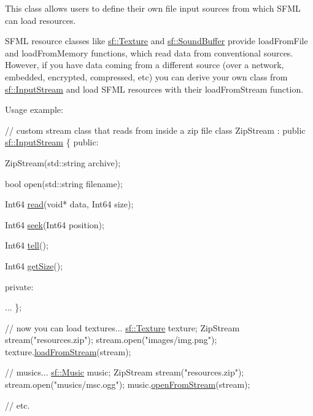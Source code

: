 This class allows users to define their own file input sources from which S\+F\+ML can load resources.

S\+F\+ML resource classes like \hyperlink{classsf_1_1Texture}{sf\+::\+Texture} and \hyperlink{classsf_1_1SoundBuffer}{sf\+::\+Sound\+Buffer} provide load\+From\+File and load\+From\+Memory functions, which read data from conventional sources. However, if you have data coming from a different source (over a network, embedded, encrypted, compressed, etc) you can derive your own class from \hyperlink{classsf_1_1InputStream}{sf\+::\+Input\+Stream} and load S\+F\+ML resources with their load\+From\+Stream function.

Usage example\+: 
\begin{DoxyCode}
\textcolor{comment}{// custom stream class that reads from inside a zip file}
\textcolor{keyword}{class }ZipStream : \textcolor{keyword}{public} \hyperlink{classsf_1_1InputStream}{sf::InputStream}
\{
\textcolor{keyword}{public}:

    ZipStream(std::string archive);

    \textcolor{keywordtype}{bool} open(std::string filename);

    Int64 \hyperlink{classsf_1_1InputStream_a8dd89c74c1acb693203f50e750c6ae53}{read}(\textcolor{keywordtype}{void}* data, Int64 size);

    Int64 \hyperlink{classsf_1_1InputStream_a76aba8e5d5cf9b1c5902d5e04f7864fc}{seek}(Int64 position);

    Int64 \hyperlink{classsf_1_1InputStream_a599515b9ccdbddb6fef5a98424fd559c}{tell}();

    Int64 \hyperlink{classsf_1_1InputStream_a311eaaaa65d636728e5153b574b72d5d}{getSize}();

\textcolor{keyword}{private}:

    ...
\};

\textcolor{comment}{// now you can load textures...}
\hyperlink{classsf_1_1Texture}{sf::Texture} texture;
ZipStream stream(\textcolor{stringliteral}{"resources.zip"});
stream.open(\textcolor{stringliteral}{"images/img.png"});
texture.\hyperlink{classsf_1_1Texture_a786b486a46b1c6d1c16ff4af61ecc601}{loadFromStream}(stream);

\textcolor{comment}{// musics...}
\hyperlink{classsf_1_1Music}{sf::Music} music;
ZipStream stream(\textcolor{stringliteral}{"resources.zip"});
stream.open(\textcolor{stringliteral}{"musics/msc.ogg"});
music.\hyperlink{classsf_1_1Music_a4e55d1910a26858b44778c26b237d673}{openFromStream}(stream);

\textcolor{comment}{// etc.}
\end{DoxyCode}
 

